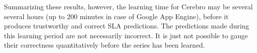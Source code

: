 Summarizing these results, however,
the learning time for Cerebro may be several
several hours (up to $200$ minutes in case of 
Google App Engine), before it produces trustworthy and correct 
SLA predictions.  The predictions made during this learning period are not
necessarily incorrect.  It is just not possible to gauge their correctness
quantitatively before the series has been learned. 
